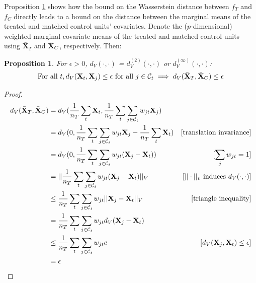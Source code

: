 \documentclass{article}
\newtheorem{proposition}[theorem]{Proposition}
\newcommand{\bX}{\mathbf{X}}
\newcommand{\Xt}{\mathbf{X}_t}
\newcommand{\Xj}{\mathbf{X}_j}
\newcommand{\Ct}{\mathcal{C}_{t}}
\begin{document}
Proposition \ref{prop:meanbd} shows how the bound on the Wasserstein distance between $f_T$ and $f_C$ directly leads to a bound on the distance between the marginal means of the treated and matched control units' covariates.
Denote the ($p$-dimensional) weighted marginal covariate means of the treated and matched control units using $\bar{\bX}_T$ and $\Bar{\bX}_C$, respectively.
Then:
\begin{proposition}
\label{prop:meanbd}
    For $\epsilon > 0$, $d_V(\cdot, \cdot)$ = $d^{(2)}_V(\cdot, \cdot)$ or $d^{(\infty)}_V(\cdot, \cdot)$:
    \begin{align*}
        \text{For all } t, d_V(\Xt, \Xj) \leq \epsilon \text{ for all } j \in \Ct
        \implies d_V(\bar{\bX}_T, \Bar{\bX}_C) \leq \epsilon
    \end{align*}
\end{proposition}
\begin{proof}
    \begin{align*}
        d_V(\bar{\bX}_T, \Bar{\bX}_C)
        &= d_V(\frac{1}{n_T} \sum_t \bX_t, \frac{1}{n_T} \sum_t \sum_{j \in \Ct} w_{jt} \bX_j) \\
        &= d_V(0, \frac{1}{n_T} \sum_t \sum_{j \in \Ct} w_{jt} \bX_j - \frac{1}{n_T} \sum_t \bX_t) &\text{[translation invariance]} \\
        &= d_V(0, \frac{1}{n_T} \sum_t \sum_{j \in \Ct} w_{jt} (\bX_j - \bX_t)) &[\sum_j w_{jt}=1] \\
        &= ||\frac{1}{n_T} \sum_t \sum_{j \in \Ct} w_{jt} (\bX_j - \bX_t)||_V &[||\cdot||_v \text{ induces } d_V(\cdot, \cdot)] \\
        &\leq \frac{1}{n_T} \sum_t \sum_{j \in \Ct} w_{jt} 
            ||\bX_j - \bX_t||_V &[\text{triangle inequality}] \\
        &= \frac{1}{n_T} \sum_t \sum_{j \in \Ct} w_{jt}
            d_V(\bX_j - \bX_t) \\
        &\leq \frac{1}{n_T} \sum_t \sum_{j \in \Ct} w_{jt} c & [d_V(\bX_j, \bX_t) \leq \epsilon] \\
        &= \epsilon
    \end{align*}
\end{proof}
\end{document}
